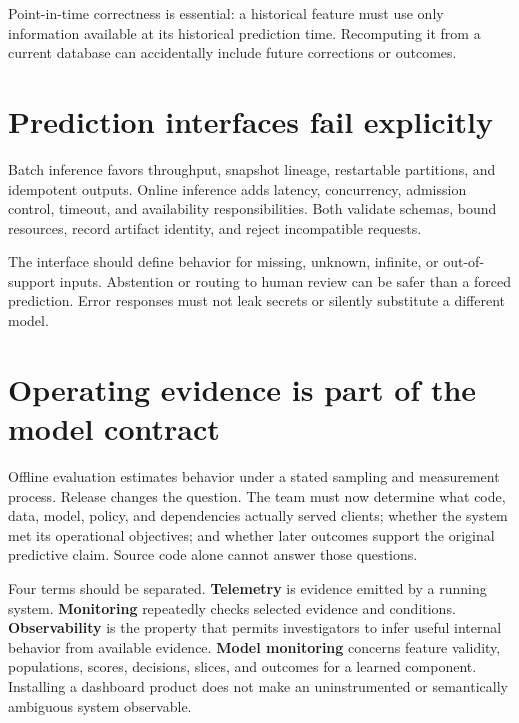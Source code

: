 Point-in-time correctness is essential: a historical feature must use only
information available at its historical prediction time. Recomputing it from a
current database can accidentally include future corrections or outcomes.


\section{Prediction interfaces fail explicitly}

Batch inference favors throughput, snapshot lineage, restartable partitions,
and idempotent outputs. Online inference adds latency, concurrency, admission
control, timeout, and availability responsibilities. Both validate schemas,
bound resources, record artifact identity, and reject incompatible requests.

The interface should define behavior for missing, unknown, infinite, or out-of-
support inputs. Abstention or routing to human review can be safer than a forced
prediction. Error responses must not leak secrets or silently substitute a
different model.

\section{Operating evidence is part of the model contract}
\label{sec:production-observability}

Offline evaluation estimates behavior under a stated sampling and measurement
process. Release changes the question. The team must now determine what code,
data, model, policy, and dependencies actually served clients; whether the
system met its operational objectives; and whether later outcomes support the
original predictive claim. Source code alone cannot answer those questions.

Four terms should be separated. \textbf{Telemetry} is evidence emitted by a
running system. \textbf{Monitoring} repeatedly checks selected evidence and
conditions. \textbf{Observability} is the property that permits investigators
to infer useful internal behavior from available evidence. \textbf{Model
monitoring} concerns feature validity, populations, scores, decisions, slices,
and outcomes for a learned component. Installing a dashboard product does not
make an uninstrumented or semantically ambiguous system observable.

